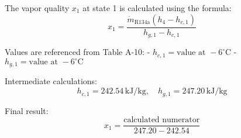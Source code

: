 The vapor quality \( x_1 \) at state 1 is calculated using the formula:  
\[
x_1 = \frac{\dot{m}_{\text{R134a}} (h_4 - h_{c,1})}{h_{g,1} - h_{c,1}}
\]  

Values are referenced from Table A-10:  
- \( h_{c,1} = \text{value at } -6^\circ\text{C} \)  
- \( h_{g,1} = \text{value at } -6^\circ\text{C} \)  

Intermediate calculations:  
\[
h_{c,1} = 242.54 \, \text{kJ/kg}, \quad h_{g,1} = 247.20 \, \text{kJ/kg}
\]  

Final result:  
\[
x_1 = \frac{\text{calculated numerator}}{247.20 - 242.54}
\]